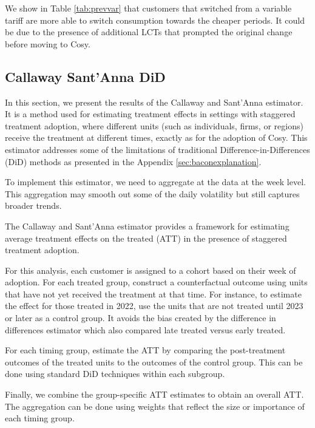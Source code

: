 \documentclass[
]{article}
\begin{document}
We show in Table \ref{tab:prevvar} that customers that switched from a variable tariff are more able to switch consumption towards the cheaper periods. It could be due to the presence of additional LCTs that prompted the original change before moving to Cosy.

\begin{landscape}

\end{landscape}

\subsection{Callaway Sant'Anna DiD}\label{sec:santanna}

In this section, we present the results of the Callaway and Sant'Anna estimator. It is a method used for estimating treatment effects in settings with staggered treatment adoption, where different units (such as individuals, firms, or regions) receive the treatment at different times, exactly as for the adoption of Cosy. This estimator addresses some of the limitations of traditional Difference-in-Differences (DiD) methods as presented in the Appendix \ref{sec:baconexplanation}.

To implement this estimator, we need to aggregate at the data at the week level. This aggregation may smooth out some of the daily volatility but still captures broader trends.

The Callaway and Sant'Anna estimator provides a framework for estimating average treatment effects on the treated (ATT) in the presence of staggered treatment adoption.

For this analysis, each customer is assigned to a cohort based on their week of adoption. For each treated group, construct a counterfactual outcome using units that have not yet received the treatment at that time. For instance, to estimate the effect for those treated in 2022, use the units that are not treated until 2023 or later as a control group. It avoids the bias created by the difference in differences estimator which also compared late treated versus early treated.

For each timing group, estimate the ATT by comparing the post-treatment outcomes of the treated units to the outcomes of the control group. This can be done using standard DiD techniques within each subgroup.

Finally, we combine the group-specific ATT estimates to obtain an overall ATT. The aggregation can be done using weights that reflect the size or importance of each timing group.
\end{document}

